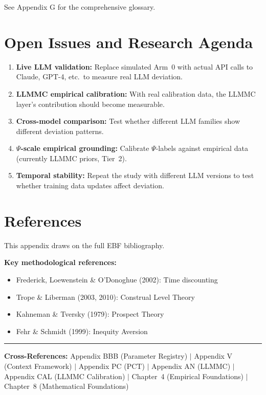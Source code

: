 See Appendix G for the comprehensive glossary.

\section{Open Issues and Research Agenda}

\begin{enumerate}
\item \textbf{Live LLM validation:} Replace simulated Arm~0 with actual
  API calls to Claude, GPT-4, etc.\ to measure real LLM deviation.
\item \textbf{LLMMC empirical calibration:} With real calibration data,
  the LLMMC layer's contribution should become measurable.
\item \textbf{Cross-model comparison:} Test whether different LLM families
  show different deviation patterns.
\item \textbf{$\Psi$-scale empirical grounding:} Calibrate $\Psi$-labels
  against empirical data (currently LLMMC priors, Tier~2).
\item \textbf{Temporal stability:} Repeat the study with different LLM
  versions to test whether training data updates affect deviation.
\end{enumerate}

\section{References}

This appendix draws on the full EBF bibliography.
\nocite{bcm_master}

\textbf{Key methodological references:}
\begin{itemize}
\item Frederick, Loewenstein \& O'Donoghue (2002): Time discounting
\item Trope \& Liberman (2003, 2010): Construal Level Theory
\item Kahneman \& Tversky (1979): Prospect Theory
\item Fehr \& Schmidt (1999): Inequity Aversion
\end{itemize}

\vfill
\noindent\rule{\textwidth}{0.4pt}
\small
\textbf{Cross-References:}
Appendix BBB (Parameter Registry) $\mid$
Appendix V (Context Framework) $\mid$
Appendix PC (PCT) $\mid$
Appendix AN (LLMMC) $\mid$
Appendix CAL (LLMMC Calibration) $\mid$
Chapter~4 (Empirical Foundations) $\mid$
Chapter~8 (Mathematical Foundations)
\normalsize
